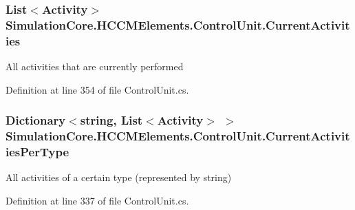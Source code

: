\subsubsection[{\texorpdfstring{Current\+Activities}{CurrentActivities}}]{\setlength{\rightskip}{0pt plus 5cm}List$<${\bf Activity}$>$ Simulation\+Core.\+H\+C\+C\+M\+Elements.\+Control\+Unit.\+Current\+Activities\hspace{0.3cm}{\ttfamily [get]}}\hypertarget{class_simulation_core_1_1_h_c_c_m_elements_1_1_control_unit_a9f4bff56571dc9e479a48bccc9125563}{}\label{class_simulation_core_1_1_h_c_c_m_elements_1_1_control_unit_a9f4bff56571dc9e479a48bccc9125563}


All activities that are currently performed 



Definition at line 354 of file Control\+Unit.\+cs.

\subsubsection[{\texorpdfstring{Current\+Activities\+Per\+Type}{CurrentActivitiesPerType}}]{\setlength{\rightskip}{0pt plus 5cm}Dictionary$<$string, List$<${\bf Activity}$>$ $>$ Simulation\+Core.\+H\+C\+C\+M\+Elements.\+Control\+Unit.\+Current\+Activities\+Per\+Type\hspace{0.3cm}{\ttfamily [get]}}\hypertarget{class_simulation_core_1_1_h_c_c_m_elements_1_1_control_unit_ae39305c46818d3c06de97894b410ee91}{}\label{class_simulation_core_1_1_h_c_c_m_elements_1_1_control_unit_ae39305c46818d3c06de97894b410ee91}


All activities of a certain type (represented by string) 



Definition at line 337 of file Control\+Unit.\+cs.

